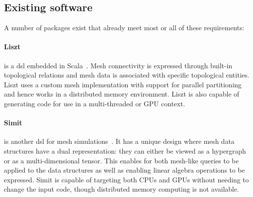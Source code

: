 \documentclass[thesis]{subfiles}
\begin{document}
\subsection{Existing software}

%

A number of packages exist that already meet most or all of these requirements:

\paragraph{Liszt}{
  is a \gls{dsl} embedded in Scala~\cite{devitoLisztDomainSpecific2011}.
  Mesh connectivity is expressed through built-in topological relations and mesh data is associated with specific topological entities.
  Liszt uses a custom mesh implementation with support for parallel partitioning and hence works in a distributed memory environment.
  Liszt is also capable of generating code for use in a multi-threaded or GPU context.
}

\paragraph{Simit}{
  is another \gls{dsl} for mesh simulations~\cite{kjolstadSimitLanguagePhysical2016}.
  It has a unique design where mesh data structures have a dual representation: they can either be viewed as a hypergraph or as a multi-dimensional tensor.
  This enables for both mesh-like queries to be applied to the data structures as well as enabling linear algebra operations to be expressed.
  Simit is capable of targeting both CPUs and GPUs without needing to change the input code, though distributed memory computing is not available.
}
\end{document}
